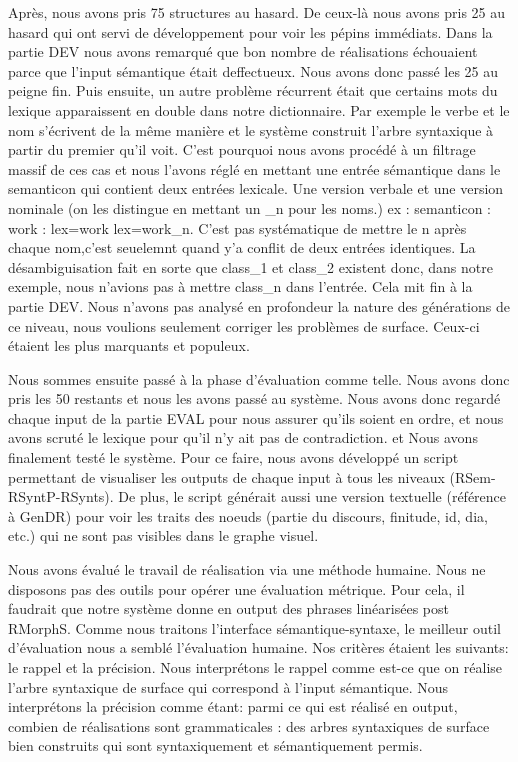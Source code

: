 Après, nous avons pris 75 structures au hasard. De ceux-là nous avons pris 25 au hasard qui ont servi de développement pour voir les pépins immédiats. Dans la partie DEV nous avons remarqué que bon nombre de réalisations échouaient parce que l'input sémantique était deffectueux. Nous avons donc passé les 25 au peigne fin. Puis ensuite, un autre problème récurrent était que certains mots du lexique apparaissent en double dans notre dictionnaire. Par exemple le verbe  et le nom  s'écrivent de la même manière et le système construit l'arbre syntaxique à partir du premier qu'il voit. C'est pourquoi nous avons procédé à un filtrage massif de ces cas et nous l'avons réglé en mettant une entrée sémantique dans le semanticon qui contient deux entrées lexicale. Une version verbale et une version nominale (on les distingue en mettant un \_n pour les noms.) ex : semanticon : work : lex=work lex=work\_n. C'est pas systématique de mettre le n après chaque nom,c'est seuelemnt quand y'a conflit de deux entrées identiques. La désambiguisation fait en sorte que class\_1 et class\_2 existent donc, dans notre exemple, nous n'avions pas à mettre class\_n dans l'entrée. Cela mit fin à la partie DEV.  Nous n'avons pas analysé en profondeur la nature des générations de ce niveau, nous voulions seulement corriger les problèmes de surface. Ceux-ci étaient les plus marquants et populeux.

Nous sommes ensuite passé à la phase d'évaluation comme telle. Nous avons donc pris les 50 restants et nous les avons passé au système. Nous avons donc regardé chaque input de la partie EVAL pour nous assurer qu'ils soient en ordre, et nous avons scruté le lexique pour qu'il n'y ait pas de contradiction. et Nous avons finalement testé le système. Pour ce faire, nous avons développé un script permettant de visualiser les outputs de chaque input à tous les niveaux (RSem-RSyntP-RSynts). De plus, le script générait aussi une version textuelle (référence à GenDR) pour voir les traits des noeuds (partie du discours, finitude, id, dia, etc.) qui ne sont pas visibles dans le graphe visuel. 

Nous avons évalué le travail de réalisation via une méthode humaine. Nous ne disposons pas des outils pour opérer une évaluation métrique. Pour cela, il faudrait que notre système donne en output des phrases linéarisées post RMorphS. Comme nous traitons l'interface sémantique-syntaxe, le meilleur outil d'évaluation nous a semblé l'évaluation humaine. Nos critères étaient les suivants: le rappel et la précision. Nous interprétons le rappel comme est-ce que on réalise l'arbre syntaxique de surface qui correspond à l'input sémantique. Nous interprétons la précision comme étant: parmi ce qui est réalisé en output, combien de réalisations sont grammaticales : des arbres syntaxiques de surface bien construits qui sont syntaxiquement et sémantiquement permis.

